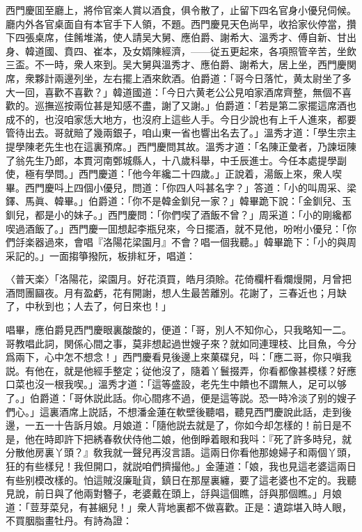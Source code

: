 西門慶囬至廳上，將伶官楽人賞以酒食，俱令散了，止留下四名官身小優兒伺候。廳内外各官桌面自有本官手下人領，不題。西門慶見天色尚早，收拾家伙停當，攢下四張桌席，佳餚堆滿，使人請吴大舅、應伯爵、謝希大、溫秀才、傅自新、甘出身、韓道國、賁四、崔本，及女婿陳經濟，——従五更起來，各項照管辛苦，坐飲三盃。不一時，衆人來到。吴大舅與溫秀才、應伯爵、謝希大，居上坐，西門慶関席，衆夥計兩邊列坐，左右擺上酒來飲酒。伯爵道：「哥今日落忙，黄太尉坐了多大一回，喜歡不喜歡？」韓道國道：「今日六黄老公公見咱家酒席齊整，無個不喜歡的。巡撫巡按兩位甚是知感不盡，謝了又謝。」伯爵道：「若是第二家擺這席酒也成不的，也沒咱家恁大地方，也沒府上這些人手。今日少說也有上千人進來，都要管待出去。哥就賠了幾兩銀子，咱山東一省也響出名去了。」溫秀才道：「學生宗主提學陳老先生也在這裏預席。」西門慶問其故。溫秀才道：「名陳正彙者，乃諫垣陳了翁先生乃郎，本貫河南鄄城縣人，十八歲科舉，中壬辰進士。今任本處提學副使，極有學問。」西門慶道：「他今年纔二十四歲。」正說着，湯飯上來，衆人喫畢。西門慶呌上四個小優兒，問道：「你四人呌甚名字？」答道：「小的叫周采、梁鐸、馬眞、韓畢。」伯爵道：「你不是韓金釧兒一家？」韓畢跪下說：「金釧兒、玉釧兒，都是小的妹子。」西門慶問：「你們喫了酒飯不曾？」周采道：「小的剛纔都喫過酒飯了。」西門慶一囬想起李瓶兒來，今日擺酒，就不見他，吩咐小優兒：「你們㧱楽器過來，會唱『洛陽花梁園月』不會？唱一個我聽。」韓畢跪下：「小的與周采記的。」一面搊箏撥阮，板排紅牙，唱道：

〈普天楽〉「洛陽花，梁園月。好花湏買，皓月須賒。花倚欄杆看爛熳開，月曾把酒問團圝夜。月有盈虧，花有開謝，想人生最苦離別。花謝了，三春近也；月缺了，中秋到也；人去了，何日來也！」

唱畢，應伯爵見西門慶眼裏酸酸的，便道：「哥，別人不知你心，只我略知一二。哥教唱此詞，関係心間之事，莫非想起過世嫂子來？就如同連理枝、比目魚，今分爲兩下，心中怎不想念！」西門慶看見後邊上來菓碟兒，呌：「應二哥，你只嗔我説。有他在，就是他經手整定；従他沒了，隨着丫鬟掇弄，你看都像甚模樣？好應口菜也沒一根我喫。」溫秀才道：「這等盛設，老先生中饋也不謂無人，足可以够了。」伯爵道：「哥休説此話。你心間疼不過，便是這等説。恐一時冷淡了别的嫂子們心。」這裏酒席上説話，不想潘金蓮在軟壁後聽唱，聽見西門慶說此話，走到後邊，一五一十告訴月娘。月娘道：「隨他説去就是了，你如今却怎樣的！前日是不是，他在時即許下把綉春敎伏侍他二娘，他倒睜着眼和我呌：『死了許多時兒，就分散他房裏丫頭？』敎我就一聲兒再沒言語。這兩日你看他那媳婦子和兩個丫頭，狂的有些樣兒！我但開口，就説咱們擠撮他。」金蓮道：「娘，我也見這老婆這兩日有些别模改樣的。怕這賊沒廉耻貨，鎮日在那屋裏纏，要了這老婆也不定的。我聽見說，前日與了他兩對簪子，老婆戴在頭上，㧱與這個瞧，㧱與那個瞧。」月娘道：「荳芽菜兒，有甚綑兒！」衆人背地裏都不做喜歡。正是：遺踪堪入時人眼，不買胭脂畫牡丹。有詩為證：

